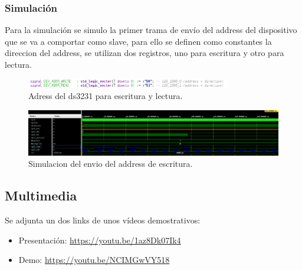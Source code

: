\documentclass[11pt, a4paper]{article}
\begin{document}
		\subsubsection{Simulación}
		Para la simulación se simulo la primer trama de envío del address del dispositivo que se va a comportar como slave, para ello se definen como constantes la direccion del address, se utilizan dos registros, uno para escritura y otro para lectura.

		\begin{figure}[H]
			\centering
			\includegraphics[width=0.8\textwidth]{Imagenes/addr_constant.png}
			\caption{Adress del ds3231 para escritura y lectura.}
		\end{figure} 

		\begin{figure}[H]
			\centering
			\includegraphics[width=\textwidth]{Imagenes/add_i2c.png}
			\caption{Simulacion del envio del address de escritura.}
		\end{figure} 
\clearpage

		\subsection{Multimedia}
		Se adjunta un dos links de unos vídeos demostrativos: 
		\begin{itemize}
			\item Presentación: \url{https://youtu.be/1az8Dk07Ik4}
			\item Demo: \url{https://youtu.be/NCIMGwVY518}
		\end{itemize}
		
\end{document}
